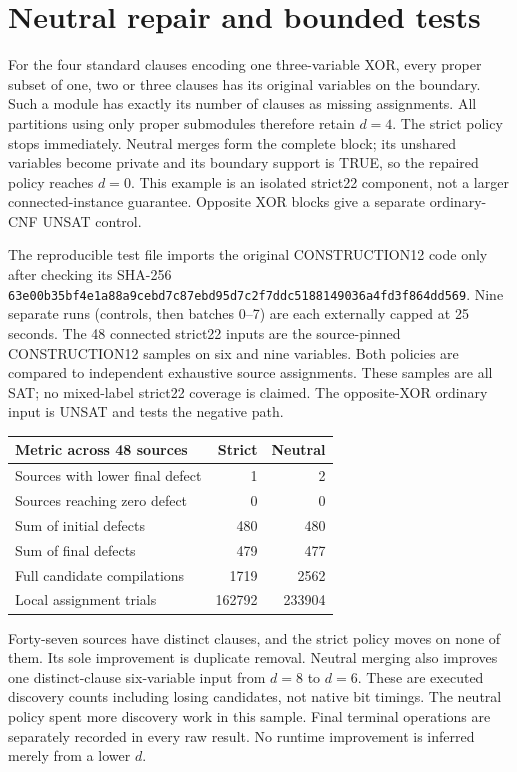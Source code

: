 \documentclass[11pt]{article}
\begin{document}
\section{Neutral repair and bounded tests}
For the four standard clauses encoding one three-variable XOR, every proper
subset of one, two or three clauses has its original variables on the boundary.
Such a module has exactly its number of clauses as missing assignments.
All partitions using only proper submodules therefore retain $d=4$.
The strict policy stops immediately. Neutral merges form the complete block;
its unshared variables become private and its boundary support is TRUE,
so the repaired policy reaches $d=0$. This example is an isolated strict22
component, not a larger connected-instance guarantee.
Opposite XOR blocks give a separate ordinary-CNF UNSAT control.

The reproducible test file imports the original CONSTRUCTION12 code only
after checking its SHA-256
\texttt{63e00b35bf4e1a88a9cebd7c87ebd95d7c2f7ddc5188149036a4fd3f864dd569}.
Nine separate runs (controls, then batches 0--7) are each externally capped
at 25 seconds. The 48 connected strict22 inputs are the source-pinned
CONSTRUCTION12 samples on six and nine variables. Both policies are
compared to independent exhaustive source assignments. These samples
are all SAT; no mixed-label strict22 coverage is claimed.
The opposite-XOR ordinary input is UNSAT and tests the negative path.

\begin{center}
\begin{tabular}{lrr}
\toprule
Metric across 48 sources & Strict & Neutral\\\midrule
Sources with lower final defect &1&2\\
Sources reaching zero defect &0&0\\
Sum of initial defects &480&480\\
Sum of final defects &479&477\\
Full candidate compilations &1719&2562\\
Local assignment trials &162792&233904\\
\bottomrule
\end{tabular}
\end{center}
Forty-seven sources have distinct clauses, and the strict policy moves on
none of them. Its sole improvement is duplicate removal. Neutral merging
also improves one distinct-clause six-variable input from $d=8$ to $d=6$.
These are executed discovery counts including losing candidates, not native
bit timings. The neutral policy spent more discovery work in this sample.
Final terminal operations are separately recorded in every raw result.
No runtime improvement is inferred merely from a lower $d$.
\end{document}
